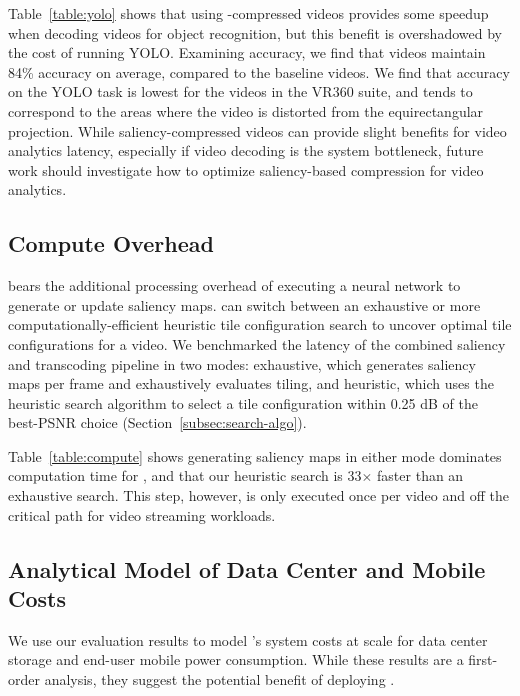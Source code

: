 Table~\ref{table:yolo} shows that using \name-compressed videos provides some speedup when decoding videos for object recognition, but this benefit is overshadowed by the cost of running YOLO.
Examining accuracy, we find that \name videos maintain 84\% accuracy on average, compared to the baseline \hevc videos.
We find that accuracy on the YOLO task is lowest for the videos in the VR360 suite, and tends to correspond to the areas where the video is distorted from the equirectangular projection.
While saliency-compressed videos can provide slight benefits for video analytics latency, especially if video decoding is the system bottleneck, future work should investigate how to optimize saliency-based compression for video analytics.


\subsection{Compute Overhead}
\nameCompress bears the additional processing overhead of executing a neural network to generate or update saliency maps.
\nameStore can switch between an exhaustive or more computationally-efficient heuristic tile configuration search to uncover optimal tile configurations for a video.
We benchmarked the latency of the combined saliency and transcoding pipeline in two modes: exhaustive, which generates saliency maps per frame and exhaustively evaluates tiling, and heuristic, which uses the heuristic search algorithm to select a tile configuration within 0.25 dB of the best-PSNR choice (Section~\ref{subsec:search-algo}).

\computeTable

Table~\ref{table:compute} shows generating saliency maps in either mode dominates computation time for \name, and that our heuristic search is 33$\times$ faster than an exhaustive search.
This step, however, is only executed once per video and off the critical path for video streaming workloads.


\subsection{Analytical Model of \name Data Center and Mobile Costs}
\label{subsec:datacentermobile}
We use our evaluation results to model \name's system costs at scale for data center storage and end-user mobile power consumption. While these results are a first-order analysis, they suggest the potential benefit of deploying \name.

